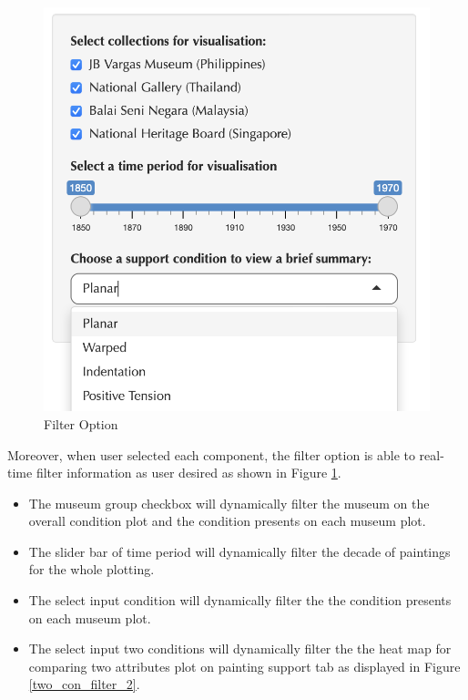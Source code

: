 \documentclass[11pt, oneside]{article}
\begin{document}
\newpage
\begin{figure}[H]
    \centering
    \includegraphics[scale=0.5]{images/filter_option.png}
    \caption{Filter Option}
    \label{filter_2}
\end{figure}

\noindent Moreover, when user selected each component, the filter option is able to real-time filter information as user desired as shown in Figure \ref{filter_2}.
\begin{itemize}
    \item The museum group checkbox will dynamically filter the museum on the overall condition plot and the condition presents on each museum plot.
    \item The slider bar of time period will dynamically filter the decade of paintings for the whole plotting.
    \item The select input condition will dynamically filter the the condition presents on each museum plot.
    \item The select input two conditions will dynamically filter the the heat map for comparing two attributes plot on painting support tab as displayed in Figure \ref{two_con_filter_2}.
\end{itemize}
\end{document}
